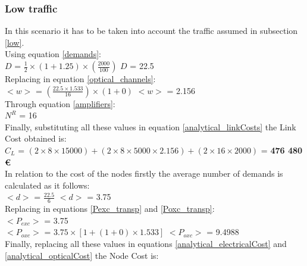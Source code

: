 \subsubsection{Low traffic}

\vspace{11pt}
In this scenario it has to be taken into account the traffic assumed in subsection \ref{low}.\\

Using equation \ref{demands}:\\

$D$ = ${\frac{1}{2}} \times {( 1 + 1.25 )} \times ( \frac{2000}{100} )$ \qquad \qquad $D$ = 22.5\\

Replacing in equation \ref{optical_channels}:\\

$<w>$ = $(\frac{22.5 \times 1.533}{16} ) \times ( 1 + 0)$ \qquad \qquad $<w>$ = 2.156\\

Through equation \ref{amplifiers}:\\

$N^R$ = 16\\

Finally, substituting all these values in equation \ref{analytical_linkCosts} the Link Cost obtained is:\\

$C_L$ = $(2 \times 8 \times 15 000) + (2 \times 8 \times 5 000 \times 2.156) + (2 \times 16 \times 2000)$ = \textbf{476 480 \euro}\\

In relation to the cost of the nodes firstly the average number of demands is calculated as it follows:\\

$<d>$ = $\frac{22.5}{6}$ \qquad \qquad $<d>$ = 3.75\\

Replacing in equations \ref{Pexc_transp} and \ref{Poxc_transp}:\\

$<P_{exc}>$ = 3.75\\

$<P_{oxc}>$ = $3.75 \times [1 + (1 + 0 ) \times 1.533]$ \qquad \quad $<P_{oxc}>$ = 9.4988 \\

Finally, replacing all these values in equations \ref{analytical_electricalCost} and \ref{analytical_opticalCost} the Node Cost is:\\

